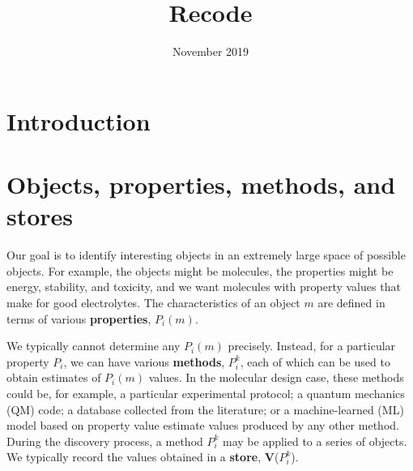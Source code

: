 \documentclass[10pt]{article}
\title{Recode}
\date{November 2019}
\begin{document}
\maketitle

\section{Introduction}


\section{Objects, properties, methods, and stores}

Our goal is to identify interesting objects in an extremely large space of possible objects.
For example, the objects might be molecules, the properties might be energy, stability, and toxicity, and we want molecules with property values that make for good electrolytes. 
The characteristics of an object $m$ are defined in terms of various \textbf{properties}, $P_i(m)$.

We typically cannot determine any $P_i(m)$ precisely. Instead, for a particular property $P_i$, we can have various \textbf{methods}, $P_i^k$, 
each of which can be used to obtain estimates of $P_i(m)$ values. In the molecular design case, these methods could be, for example, 
a particular experimental protocol; 
a quantum mechanics (QM) code; 
a database collected from the literature; or
a machine-learned (ML) model based on property value estimate values produced by any other method.
During the discovery process, a method $P_i^k$ may be applied to a series of objects. 
We typically record the values obtained in a \textbf{store}, \textbf{V}($P_i^k$).
\end{document}
